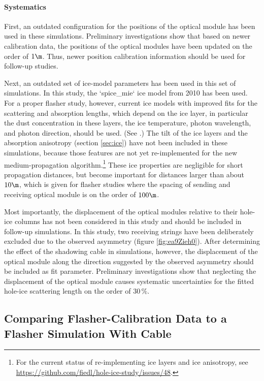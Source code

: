 \paragraph{Systematics}
First, an outdated configuration for the positions of the optical module has been used in these simulations. Preliminary investigations show that based on newer calibration data, the positions of the optical modules have been updated on the order of $1\m$. Thus, newer position calibration information should be used for follow-up studies.

Next, an outdated set of ice-model parameters has been used in this set of simulations. In this study, the `spice_mie` ice model from 2010 has been used. For a proper flasher study, however, current ice models with improved fits for the scattering and absorption lengths, which depend on the ice layer, in particular the dust concentration in these layers, the ice temperature, photon wavelength, and photon direction, should be used. (See \cite{icepaper,flasherdataderivedicemodels}.)
The tilt of the ice layers and the absorption anisotropy (section \ref{sec:ice}) have not been included in these simulations, because those features are not yet re-implemented for the new medium-propagation algorithm.\footnote{For the current status of re-implementing ice layers and ice anisotropy, see \url{https://github.com/fiedl/hole-ice-study/issues/48}.} These ice properties are negligible for short propagation distances, but become important for distances larger than about $10\m$, which is given for flasher studies where the spacing of sending and receiving optical module is on the order of $100\m$.

Most importantly, the displacement of the optical modules relative to their hole-ice columns has not been considered in this study and should be included in follow-up simulations. In this study, two receiving strings have been deliberately excluded due to the observed asymmetry (figure \ref{fig:ea9Zieh0}). After determining the effect of the shadowing cable in simulations, however, the displacement of the optical module along the direction suggested by the observed asymmetry should be included as fit parameter. Preliminary investigations show that neglecting the displacement of the optical module causes systematic uncertainties for the fitted hole-ice scattering length on the order of $30\,\%$.


\subsection{Comparing Flasher-Calibration Data to a Flasher Simulation With Cable}
\label{sec:flasher_with_cable}

